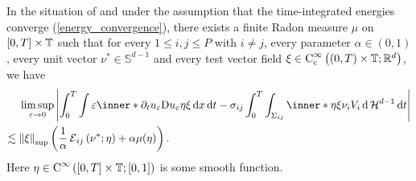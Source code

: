 \begin{proposition}
	\label{convergence_of_velocity_multiphase}
	In the situation of  and under 
	the assumption that the time-integrated energies converge 
	(\ref{energy_convergence}), there exists a finite Radon measure $ \mu $ on 
	$ [ 0 , T ] \times \operatorname{\mathbb{T}} $ such that for every $ 1 \leq i , j \leq P $ 
	with $ i \neq j $, every parameter $ \alpha \in ( 0 , 1 ) $, every unit 
	vector $ \nu^{ \ast } \in \mathbb{ S }^{ d - 1 } $ and every test vector 
	field $ \xi \in \operatorname{C}_{ \mathrm{c} }^{ \infty } \left( ( 0 , T ) \times 
	\operatorname{\mathbb{T}} ; \mathbb{ R }^{ d } \right) $, we have
	\begin{align*}
		& \limsup_{ \varepsilon \to 0 }
		\abs{
			\int_{ 0 }^{ T }
			\int
			\varepsilon
			\inner*{ \partial_{ t } u_{ \varepsilon } }{ \diff u_{ 
					\varepsilon } \eta \xi }
			\dd{ x }
			\dd{ t }
			-
			\sigma_{ i j }
			\int_{ 0 }^{ T }
			\int_{ \Sigma_{ i j } }
			\inner*{ \eta \xi }{ \nu_{ i } } V_{ i }
			\dd{ \hm^{ d - 1 } }
			\dd{ t }
		}
		\\
		\lesssim{} &
		\norm{ \xi }_{ \mathrm{sup} }
		\left(
		\frac{ 1 }{ \alpha } \tilt_excess_{ i j } \left( \nu^{ \ast } ; 
		\eta \right) 
		+ \alpha \mu ( \eta ) 
		\right).
	\end{align*}
	Here $ \eta \in \operatorname{C}^{ \infty } \left( [ 0 , T ] \times \operatorname{\mathbb{T}} ;  
	[ 0 , 1 ]
	\right) $ is some smooth function.
\end{proposition}

